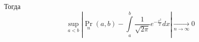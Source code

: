 \begin{itemize}
\begin{theorem}
            Тогда
            \[
                \sup_{a<b} \left|\Pr_n(a, b) - \int\limits_a^b\frac{1}{\sqrt{2\pi}}e^{-\frac{x^{2}}{2}}dx\right| \xrightarrow[n\to\infty]{} 0
            \]
        \end{theorem}

\end{itemize}
